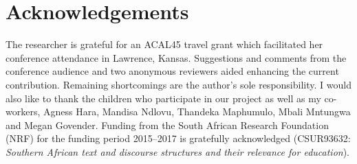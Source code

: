 \documentclass[output=paper,modfonts]{langscibook}
\begin{document}
\section*{Acknowledgements}\label{sec:tappe:6}

The researcher is grateful for an ACAL45 travel grant which facilitated her conference attendance in Lawrence, Kansas. Suggestions and comments from the conference audience and two anonymous reviewers aided enhancing the current contribution. Remaining shortcomings are the author’s sole responsibility. I would also like to thank the children who participate in our project as well as my co-workers, Agness Hara, Mandisa Ndlovu, Thandeka Maphumulo, Mbali Mntungwa and Megan Govender. Funding from the South African Research Foundation (NRF) for the funding period 2015--2017 is gratefully acknowledged (CSUR93632: \textit{Southern African text and discourse structures and their relevance for education}).
 
 
\sloppy
\printbibliography[heading=subbibliography,notkeyword=this]
\end{document}
